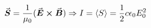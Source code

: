 

\vspace*{\fill}
\centering

\begin{align*}
   \va*{S} = \frac{1}{\mu_0}(\va*{E} \cross \va*{B}) \Rightarrow I = \langle S \rangle = \frac{1}{2} c \epsilon_0 E_0^2
\end{align*}

\centering
\vspace*{\fill}

